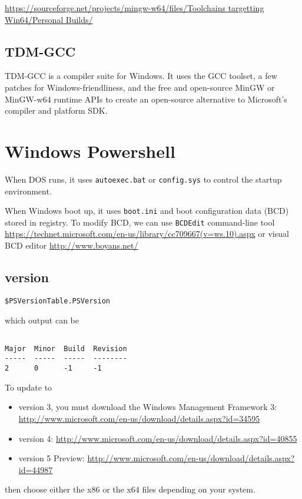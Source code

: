 \url{https://sourceforge.net/projects/mingw-w64/files/Toolchains targetting Win64/Personal Builds/}

\subsection{TDM-GCC}

TDM-GCC is a compiler suite for Windows.
It uses the GCC toolset, a few patches for Windows-friendliness, and the free
and open-source MinGW or MinGW-w64 runtime APIs to create an open-source
alternative to Microsoft's compiler and platform SDK.


\section{Windows Powershell}
\label{sec:windows_powershell}

When DOS runs, it uses \verb!autoexec.bat! or \verb!config.sys! to control the
startup environment. 

When Windows boot up, it uses \verb!boot.ini! and boot configuration data
(BCD) stored in registry. To modify BCD, we can use \verb!BCDEdit! command-line
tool
\url{https://technet.microsoft.com/en-us/library/cc709667(v=ws.10).aspx}
or visual BCD editor \url{http://www.boyans.net/}

\subsection{version}
\label{sec:version_PowerShell}

\begin{verbatim}
$PSVersionTable.PSVersion
\end{verbatim}
which output can be
\begin{verbatim}

Major  Minor  Build  Revision
-----  -----  -----  --------
2      0      -1     -1

\end{verbatim}

 To update to 
 \begin{itemize}
   \item  version 3, you must download the Windows Management Framework 3: 
 \url{http://www.microsoft.com/en-us/download/details.aspx?id=34595}
   \item version 4: \url{http://www.microsoft.com/en-us/download/details.aspx?id=40855}
   
   \item version 5 Preview: \url{http://www.microsoft.com/en-us/download/details.aspx?id=44987}
 \end{itemize}
then choose either the x86 or the x64 files depending on your system.

